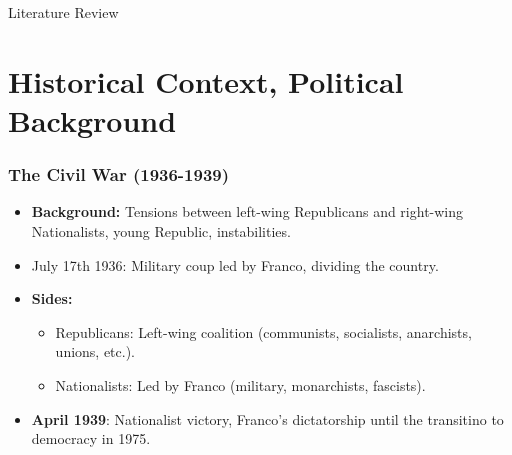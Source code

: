 \documentclass[xcolor=dvipsnames, aspectratio=169]{beamer}
\begin{document}
\begin{frame}{Literature Review}
\end{frame}





\section{Historical Context, Political Background}






\begin{frame}
  \frametitle{The Civil War (1936-1939)}
  \footnotesize
  \begin{itemize}
    \item \textbf{Background:} Tensions between left-wing Republicans and right-wing Nationalists, young Republic, instabilities.
    \vspace{0.1in}
    \item July 17th 1936: Military coup led by Franco, dividing the country.
    \vspace{0.1in}
    \item \textbf{Sides:} 
      \begin{itemize}
        \item Republicans: Left-wing coalition (communists, socialists, anarchists, unions, etc.).
        \item Nationalists: Led by Franco (military, monarchists, fascists).
      \end{itemize}
      \vspace{0.1in}
    \item \textbf{April 1939}: Nationalist victory, Franco's dictatorship until the transitino to democracy in 1975.
  \end{itemize}
\end{frame}
\end{document}
